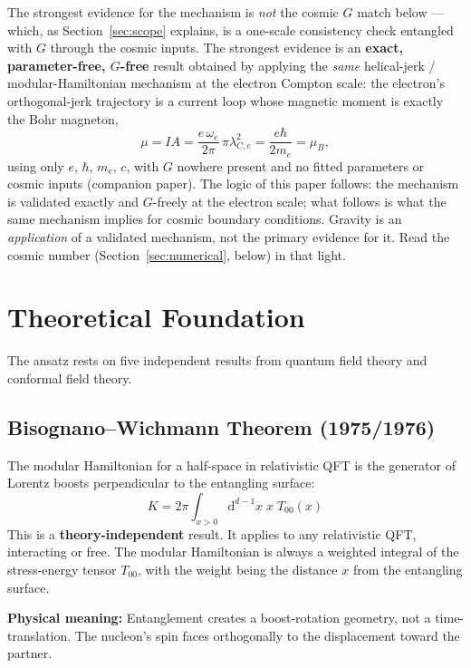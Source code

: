 \documentclass[11pt,letterpaper]{article}
\begin{document}
The strongest evidence for the mechanism is \emph{not} the cosmic $G$ match
below --- which, as Section~\ref{sec:scope} explains, is a one-scale consistency
check entangled with $G$ through the cosmic inputs. The strongest evidence is an
\textbf{exact, parameter-free, $G$-free} result obtained by applying the
\emph{same} helical-jerk / modular-Hamiltonian mechanism at the electron Compton
scale: the electron's orthogonal-jerk trajectory is a current loop whose
magnetic moment is exactly the Bohr magneton,
\begin{equation}
  \mu = I A = \frac{e\,\omega_e}{2\pi}\,\pi\lambda_{C,e}^2 = \frac{e\hbar}{2 m_e}
      = \mu_B,
\end{equation}
using only $e$, $\hbar$, $m_e$, $c$, with $G$ nowhere present and no fitted
parameters or cosmic inputs (companion paper). The logic of this paper follows:
the mechanism is validated exactly and $G$-freely at the electron scale; what
follows is what the same mechanism implies for cosmic boundary conditions.
Gravity is an \emph{application} of a validated mechanism, not the primary
evidence for it. Read the cosmic number
(Section~\ref{sec:numerical}, below) in that light.

\section{Theoretical Foundation}

The ansatz rests on five independent results from quantum field theory
and conformal field theory.

\subsection{Bisognano--Wichmann Theorem (1975/1976)}
\label{sec:bw}

The modular Hamiltonian for a half-space in relativistic QFT is the generator
of Lorentz boosts perpendicular to the entangling surface:
\begin{equation}
  K = 2\pi \int_{x>0} \mathrm{d}^{d-1}x \; x \; T_{00}(x)
  \label{eq:bw}
\end{equation}
This is a \textbf{theory-independent} result. It applies to any relativistic QFT,
interacting or free. The modular Hamiltonian is always a weighted integral of
the stress-energy tensor $T_{00}$, with the weight being the distance $x$ from
the entangling surface.

\textbf{Physical meaning:} Entanglement creates a boost-rotation geometry, not a
time-translation. The nucleon's spin faces orthogonally to the displacement
toward the partner.
\end{document}
